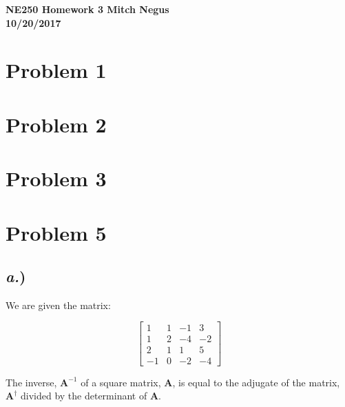 \documentclass{article}
\begin{document}
\thispagestyle{empty}

{\bf {\large {NE250 Homework {3} \hfill Mitch Negus\\
		\hspace*{\fill} 10/20/2017\\ }}}
		
		
		

\section*{Problem 1}




\section*{Problem 2}





\section*{Problem 3}





\section*{Problem 5}

\subsection*{\textit{a.})}

We are given the matrix:

$$\begin{bmatrix}
1 	&	1	&	-1	&	3	\\
1	&	2	&	-4	&	-2	\\
2	&	1	&	1	&	5	\\
-1	&	0	&	-2	&	-4	\end{bmatrix}$$

The inverse, $\textbf{A}^{-1}$ of a square matrix, $\textbf{A}$,  is equal to the adjugate of the matrix, $\textbf{A}^{\dagger}$ divided by the determinant of $\textbf{A}$. 
\end{document}
